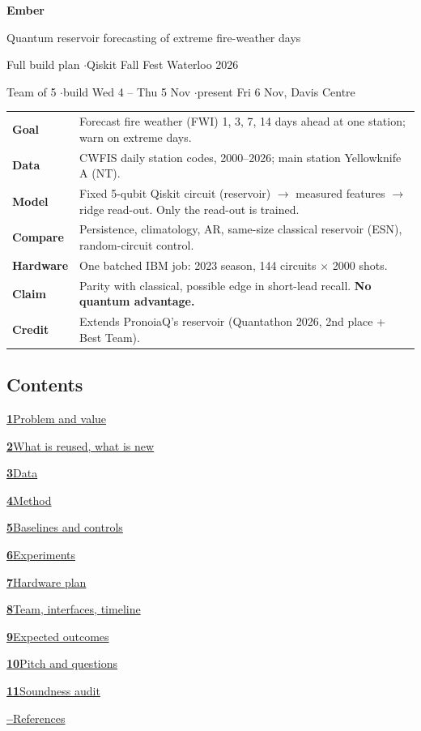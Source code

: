 \documentclass[11pt,a4paper]{article}
\newcommand{\tocsec}[2]{\par\noindent\hyperlink{section.#1}{\textbf{#1}\quad #2}\par}
\begin{document}
\begin{center}
{\LARGE\bfseries Ember}\par\smallskip
{\Large Quantum reservoir forecasting of extreme fire-weather days}\par\medskip
{\normalsize Full build plan \quad$\cdot$\quad Qiskit Fall Fest Waterloo 2026}\par
{\small Team of 5 \quad$\cdot$\quad build Wed 4 -- Thu 5 Nov \quad$\cdot$\quad present Fri 6 Nov, Davis Centre}\par
\end{center}

\begin{glance}
\begin{tabularx}{\linewidth}{@{}l Y@{}}
\textbf{Goal} & Forecast fire weather (FWI) 1, 3, 7, 14 days ahead at one station; warn on extreme days.\\
\textbf{Data} & CWFIS daily station codes, 2000--2026; main station Yellowknife A (NT).\\
\textbf{Model} & Fixed 5-qubit Qiskit circuit (reservoir) $\to$ measured features $\to$ ridge read-out. Only the
read-out is trained.\\
\textbf{Compare} & Persistence, climatology, AR, same-size classical reservoir (ESN), random-circuit control.\\
\textbf{Hardware} & One batched IBM job: 2023 season, 144 circuits $\times$ 2000 shots.\\
\textbf{Claim} & Parity with classical, possible edge in short-lead recall. \textbf{No quantum advantage.}\\
\textbf{Credit} & Extends PronoiaQ's reservoir (Quantathon 2026, 2nd place + Best Team).\\
\end{tabularx}
\end{glance}

\subsection*{Contents}
\tocsec{1}{Problem and value}
\tocsec{2}{What is reused, what is new}
\tocsec{3}{Data}
\tocsec{4}{Method}
\tocsec{5}{Baselines and controls}
\tocsec{6}{Experiments}
\tocsec{7}{Hardware plan}
\tocsec{8}{Team, interfaces, timeline}
\tocsec{9}{Expected outcomes}
\tocsec{10}{Pitch and questions}
\tocsec{11}{Soundness audit}
\par\noindent\hyperlink{refs}{\textbf{--}\quad References}\par
\end{document}
